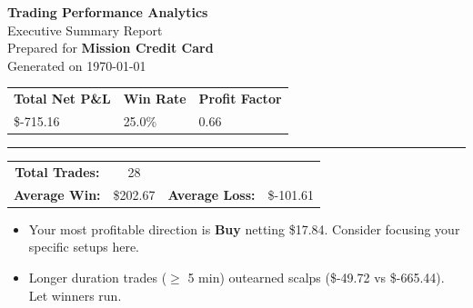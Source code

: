 \documentclass[11pt,a4paper]{article}
\begin{document}
\begin{center}
{\Huge\bfseries\color{brandblue} Trading Performance Analytics}\\[0.5em]
{\Large Executive Summary Report}\\[1em]
{\large Prepared for \textbf{Mission Credit Card}}\\[0.5em]
{\small Generated on \today}
\end{center}
\vspace{1em}

\begin{tcolorbox}[colframe=brandblue, colback=surface, title=Free Tier --- Trade Log Transparency, title filled=true, fonttitle=\bfseries\large]
\begin{center}
\renewcommand{\arraystretch}{1.5}
\begin{tabular}{p{} p{} p{}}
\textbf{Total Net P\&L} & \textbf{Win Rate} & \textbf{Profit Factor} \\
{\Large \color{badred} \$-715.16} & {\Large 25.0\%} & {\Large 0.66} \\
\end{tabular}
\end{center}
\vspace{0.5em}
\hrule
\vspace{0.5em}
\begin{center}
\renewcommand{\arraystretch}{1.2}
\begin{tabular}{cccc}
\textbf{Total Trades:} & 28 & & \\
\textbf{Average Win:} & \color{goodgreen} \$202.67 & \textbf{Average Loss:} & \color{badred} \$-101.61 \\
\end{tabular}
\end{center}
\end{tcolorbox}

\vspace{1.5em}
\begin{tcolorbox}[colframe=brandblue, colback=white, title=Explainability \& Core Insights, fonttitle=\bfseries]
\begin{itemize}
\setlength\itemsep{0.3em}
\item Your most profitable direction is \textbf{Buy} netting \$17.84. Consider focusing your specific setups here.
\item Longer duration trades ($\geq$ 5 min) outearned scalps (\$-49.72 vs \$-665.44). Let winners run.
\end{itemize}
\end{tcolorbox}
\end{document}
